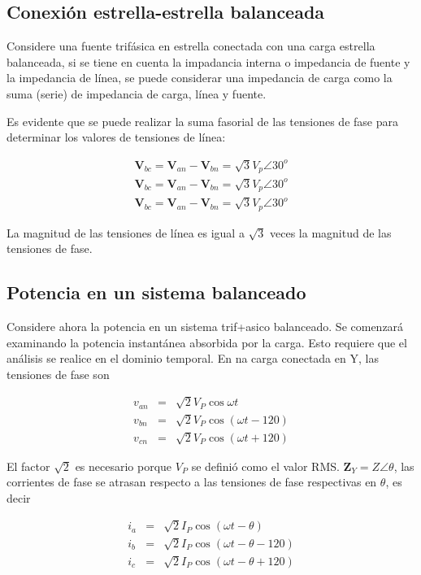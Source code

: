 \subsection{Conexión estrella-estrella balanceada}

Considere una fuente trifásica en estrella conectada con una carga estrella balanceada, si se tiene en cuenta la impadancia interna o impedancia de fuente y la impedancia de línea, se puede considerar una impedancia de carga como la suma (serie) de impedancia de carga, línea y fuente.

Es evidente que se puede realizar la suma fasorial de las tensiones de fase para determinar los valores de tensiones de línea:

\begin{eqnarray*}
\mathbf{V}_{bc} = \mathbf{V}_{an} - \mathbf{V}_{bn} = \sqrt{3} V_p \angle 30^{o} \\
\mathbf{V}_{bc} = \mathbf{V}_{an} - \mathbf{V}_{bn} = \sqrt{3} V_p \angle 30^{o} \\
\mathbf{V}_{bc} = \mathbf{V}_{an} - \mathbf{V}_{bn} = \sqrt{3} V_p \angle 30^{o}
\end{eqnarray*}

La magnitud de las tensiones de línea es igual a $\sqrt{3}$ veces la magnitud de las tensiones de fase.

\subsection{Potencia en un sistema balanceado}

Considere ahora la potencia en un sistema trif+asico balanceado. Se comenzará examinando la potencia instantánea absorbida por la carga. Esto requiere que el análisis se realice en el dominio temporal. En na carga conectada en Y, las tensiones de fase son

\begin{eqnarray*}
v_{an} &=& \sqrt{2} V_P \cos \omega t \\
v_{bn} &=& \sqrt{2} V_P \cos (\omega t -120 ) \\
v_{cn} &=& \sqrt{2} V_P \cos (\omega t +120 )
\end{eqnarray*}

El factor $\sqrt{2}$ es necesario porque $V_P$ se definió como el valor RMS. $\mathbf{Z}_Y = Z \angle \theta$, las corrientes de fase se atrasan respecto a las tensiones de fase respectivas en $\theta$, es decir

\begin{eqnarray*}
i_a &=& \sqrt{2} I_P \cos (\omega t - \theta) \\
i_b &=& \sqrt{2} I_P \cos (\omega t - \theta - 120) \\
i_c &=& \sqrt{2} I_P \cos (\omega t - \theta + 120)
\end{eqnarray*}

